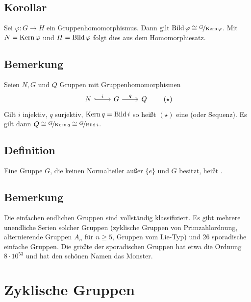 \subsection[Korollar aus dem Homomorphiesatz]{Korollar} %
\label{sub:126}
Sei $\varphi : G \to H$ ein Gruppenhomomorphismus. Dann gilt $\operatorname{Bild} \varphi \cong \nicefrac{G}{\operatorname{Kern} \varphi}$. 
Mit $N = \operatorname{Kern} \varphi$ und $H= \operatorname{Bild} \varphi$ folgt dies aus dem Homomorphiesatz.

\subsection[Bemerkung: Kurze exakte Folge]{Bemerkung} %
\label{sub:127}
Seien $N,G$ und $Q$ Gruppen mit Gruppenhomomorphismen 
\[
	\begin{tikzcd}
		N \rar[hook]{i} & G \rar[two heads]{q} & Q
	\end{tikzcd}
	\tag{$\star$}
\]
Gilt $i$ injektiv, $q$ surjektiv,
$\operatorname{Kern} q = \operatorname{Bild} i$ so heißt $(\star)$ eine  (oder Sequenz). Es gilt dann $Q\cong \nicefrac{G}{\operatorname{Kern} q} \cong \nicefrac{G}{\operatorname{Bild} i}$.

\subsection[Definition: einfache Gruppe]{Definition} %
\label{sub:128}
Eine Gruppe $G$, die keinen Normalteiler außer $\{e\}$ und $G$ besitzt, heißt . 

\subsection[Bemerkung: Die einfachen endlichen Gruppen sind vollständig klassifiziert]{Bemerkung} %
\label{sub:129}
Die einfachen endlichen Gruppen sind vollständig klassifiziert. Es gibt mehrere unendliche Serien solcher Gruppen (zyklische Gruppen von Primzahlordnung, 
alternierende Gruppen $A_n$ für $n \ge 5$, Gruppen vom Lie-Typ) und 26 sporadische einfache Gruppen. Die größte der sporadischen Gruppen hat etwa die Ordnung 
$8 \cdot 10^{53}$ und hat den schönen Namen das \glqq Monster\grqq.
\newpage

\section{Zyklische Gruppen} %
\label{sec:2}

